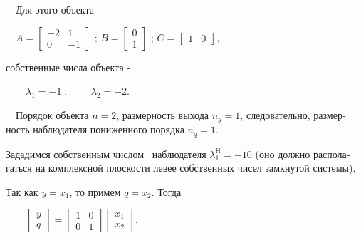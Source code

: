 \documentclass[a4paper]{article}
\begin{document}
{\begin{russian}\sffamily
\ \ Для этого объекта\ \ 
\end{russian}}

{\begin{russian}\sffamily
\ \  $A=\left[\begin{matrix}-2&1\\0&-1\end{matrix}\right]\text{   ; 
}B=\left[\begin{matrix}0\\1\end{matrix}\right]\text{  ;  }C=\left[\begin{matrix}1&0\end{matrix}\right]$,
\end{russian}}

{\begin{russian}\sffamily
собственные числа объекта -
\end{russian}}

{\begin{russian}\sffamily
\ \ \ \  $λ_1=-1\;,\;\;\;\;\;\;\;\;λ_2=-2$.
\end{russian}}

{\begin{russian}\sffamily
\ \ Порядок объекта  $n=2$, размерность выхода  $n_y=1$, следовательно, размерность наблюдателя пониженного порядка 
$n_q=1$.
\end{russian}}

{\begin{russian}\sffamily
Зададимся собственным числом \ наблюдателя  $λ_1^Н=-10$ (оно должно располагаться на комплексной плоскости левее
собственных чисел замкнутой системы).
\end{russian}}

{\begin{russian}\sffamily
Так как  $y=x_1$, то примем  $q=x_2$. Тогда
\end{russian}}

{\begin{russian}\sffamily
\ \ \ \ 
$\left[\begin{matrix}y\\q\end{matrix}\right]=\left[\begin{matrix}1&0\\0&1\end{matrix}\right]\left[\begin{matrix}x_1\\x_2\end{matrix}\right]$.
\end{russian}}
\end{document}
